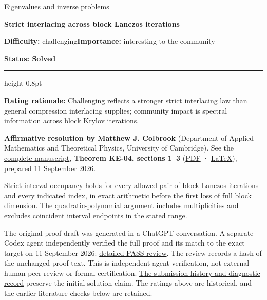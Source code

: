 \documentclass[11pt,a4paper]{article}
\makeatletter
\renewcommand{\subsection}{\Needspace{4\baselineskip}\@startsection{subsection}{2}{0pt}{9pt plus 1pt minus 1pt}{3pt}{\sffamily\bfseries\normalsize\color{ink}}}
\makeatother
\begin{document}
{\sffamily\small\color{muted}Eigenvalues and inverse problems\par}
\vspace{3pt}
{\raggedright{}\sffamily\bfseries\fontsize{21}{24}\selectfont\color{ink}Strict
interlacing across block Lanczos iterations\par}
\vspace{7pt}
{\sffamily\small\textbf{Difficulty:} challenging\quad\textbf{Importance:} interesting
to the community\par}
{\sffamily\small\bfseries\color{accent}Status: Solved\par}
\vspace{4pt}
{\color{accent}\hrule height 0.8pt}
\vspace{6pt}
\textbf{Rating rationale:} Challenging reflects a stronger strict
interlacing law than general compression interlacing supplies; community
impact is spectral information across block Krylov iterations.

\subsection{Resolution --- 2026-09-11}\label{resolution-2026-09-11}

\textbf{Affirmative resolution by Matthew J. Colbrook} (Department of
Applied Mathematics and Theoretical Physics, University of Cambridge).
See the
\href{https://github.com/ajt60gaibb/OpenProblemsInNLA/blob/main/eigenvalues-and-inverse-problems/KE-04/solution.md}{complete
manuscript}, \textbf{Theorem KE-04, sections 1--3}
(\href{https://github.com/ajt60gaibb/OpenProblemsInNLA/blob/main/eigenvalues-and-inverse-problems/KE-04/solution.pdf}{PDF}
·
\href{https://github.com/ajt60gaibb/OpenProblemsInNLA/blob/main/eigenvalues-and-inverse-problems/KE-04/solution.tex}{LaTeX}),
prepared 11 September 2026.

Strict interval occupancy holds for every allowed pair of block Lanczos
iterations and every indicated index, in exact arithmetic before the
first loss of full block dimension. The quadratic-polynomial argument
includes multiplicities and excludes coincident interval endpoints in
the stated range.

The original proof draft was generated in a ChatGPT conversation. A
separate Codex agent independently verified the full proof and its match
to the exact target on 11 September 2026:
\href{https://github.com/ajt60gaibb/OpenProblemsInNLA/blob/main/references/colbrook-2026-09-11/verification/reviews/KE-04-review.md}{detailed
PASS review}. The review records a hash of the unchanged proof text.
This is independent agent verification, not external human peer review
or formal certification.
\href{https://github.com/ajt60gaibb/OpenProblemsInNLA/blob/main/references/colbrook-2026-09-11/README.md}{The
submission history and diagnostic record} preserve the initial solution
claim. The ratings above are historical, and the earlier literature
checks below are retained.
\end{document}
